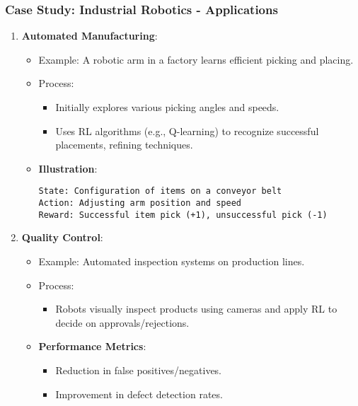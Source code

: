\documentclass[aspectratio=169]{beamer}
\begin{document}
\begin{frame}[fragile]
    \frametitle{Case Study: Industrial Robotics - Applications}
    \begin{enumerate}
        \item \textbf{Automated Manufacturing}:
        \begin{itemize}
            \item Example: A robotic arm in a factory learns efficient picking and placing.
            \item Process:
            \begin{itemize}
                \item Initially explores various picking angles and speeds.
                \item Uses RL algorithms (e.g., Q-learning) to recognize successful placements, refining techniques.
            \end{itemize}
            \item \textbf{Illustration}:
            \begin{lstlisting}
State: Configuration of items on a conveyor belt
Action: Adjusting arm position and speed
Reward: Successful item pick (+1), unsuccessful pick (-1)
            \end{lstlisting}
        \end{itemize}
        
        \item \textbf{Quality Control}:
        \begin{itemize}
            \item Example: Automated inspection systems on production lines.
            \item Process:
            \begin{itemize}
                \item Robots visually inspect products using cameras and apply RL to decide on approvals/rejections.
            \end{itemize}
            \item \textbf{Performance Metrics}:
            \begin{itemize}
                \item Reduction in false positives/negatives.
                \item Improvement in defect detection rates.
            \end{itemize}
        \end{itemize}
    \end{enumerate}
\end{frame}
\end{document}

